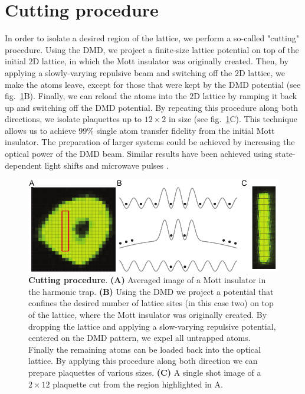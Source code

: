 \section{Cutting procedure}

In order to isolate a desired region of the lattice, we perform a so-called "cutting" procedure. Using the DMD, we project a finite-size lattice potential on top of the initial $2\mathrm{D}$ lattice, in which the Mott insulator was originally created. Then, by applying a slowly-varying repulsive beam and switching off the $2\mathrm{D}$ lattice, we make the atoms leave, except for those that were kept by the DMD potential (see fig.~\ref{fig:CTE_cutting}B). Finally, we can reload the atoms into the $2\mathrm{D}$ lattice by ramping it back up and switching off the DMD potential. By repeating this procedure along both directions, we isolate plaquettes up to $12\times2$ in size (see fig.~\ref{fig:CTE_cutting}C). This technique allows us to achieve $99\%$ single atom transfer fidelity from the initial Mott insulator. The preparation of larger systems could be achieved by increasing the optical power of the DMD beam. Similar results have been achieved using state-dependent light shifts and microwave pulses \cite{Weitenberg2011}.

\begin{figure}[t]
	\centering
	\includegraphics[scale=1]{figures/CTE_cutting.pdf}
	\caption{{\bf Cutting procedure}. {\bf (A)} Averaged image of a Mott insulator in the harmonic trap. {\bf (B)} Using the DMD we project a potential that confines the desired number of lattice sites (in this case two) on top of the lattice, where the Mott insulator was originally created. By dropping the lattice and applying a slow-varying repulsive potential, centered on the DMD pattern, we expel all untrapped atoms. Finally the remaining atoms can be loaded back into the optical lattice. By applying this procedure along both direction we can prepare plaquettes of various sizes. {\bf (C)} A single shot image of a $2 \times 12$ plaquette cut from the region highlighted in A.}
	\label{fig:CTE_cutting}
\end{figure}

